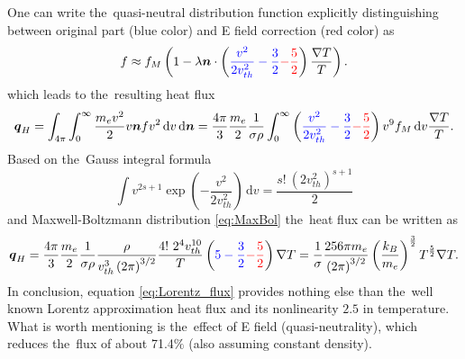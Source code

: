 \documentclass[review]{elsarticle}
\newcommand{\vect}[1]{\boldsymbol{#1}}
\newcommand{\dI}{\text{d}}
\newcommand{\mfp}{\lambda}
\newcommand{\vmag}{v}
\newcommand{\vth}{v_{th}}
\newcommand{\vn}{\vect{n}}
\newcommand{\me}{m_e}
\newcommand{\kB}{k_B}
\newcommand{\crs}{\sigma}
\newcommand{\fM}{f_M}
\begin{document}
One can write the~quasi-neutral distribution function explicitly 
distinguishing between original part (blue color) and E field correction
(red color) as
\begin{equation}
  f \approx \fM \left(1 - \mfp\vn\cdot\left( 
  \textcolor{blue}{
  \frac{\vmag^2}{2 \vth^2} - \frac{3}{2}
  }
  \textcolor{red}{
  - \frac{5}{2}
  }
  \right) \frac{\nabla T}{T} \right) .
  \label{eq:f_localized_quasineutral}
\end{equation}
which leads to the~resulting heat flux
\begin{equation}
  \vect{q}_H = \int_{4\pi}\int_0^{\infty} \frac{\me \vmag^2}{2} \vmag \vn f 
  \vmag^2\, \dI\vmag\, \dI\vn = \frac{4\pi}{3}\frac{\me}{2}\frac{1}{\crs\rho}
  \int_0^{\infty} \left( 
  \textcolor{blue}{
  \frac{\vmag^2}{2 \vth^2} - \frac{3}{2}
  }
  \textcolor{red}{
  - \frac{5}{2}
  }
  \right) \vmag^9 \fM\, \dI\vmag \frac{\nabla T}{T} .
  \nonumber
\end{equation} 
Based on the~Gauss integral formula
\begin{equation}
  \int \vmag^{2s+1} \exp\left(-\frac{\vmag^2}{2\vth^2}\right)\, \dI\vmag = 
  \frac{s!~(2 \vth^2)^{s+1}}{2}
  \nonumber 
\end{equation}
and Maxwell-Boltzmann distribution \eqref{eq:MaxBol} the~heat flux can be 
written as
\begin{equation}
  \vect{q}_H = \frac{4\pi}{3}\frac{\me}{2}\frac{1}{\crs\rho}
  \frac{\rho}{\vth^3 \left( 2 \pi \right)^{3/2}}
  \frac{4!~2^4 \vth^{10}}{T} \left( 
  \textcolor{blue}{
  5 - \frac{3}{2}
  }
  \textcolor{red}{
  - \frac{5}{2}
  }
  \right) \nabla T 
  = \frac{1}{\crs}\frac{256\pi \me}{\left( 2 \pi \right)^{3/2}}
  \left(\frac{\kB}{\me}\right)^{\frac{3}{2}}T^{\frac{5}{2}} \nabla T .
  \label{eq:Lorentz_flux}
\end{equation} 
In conclusion, equation \eqref{eq:Lorentz_flux} provides nothing else than
the~well known Lorentz approximation heat flux and its nonlinearity $2.5$
in temperature. What is worth mentioning is the~effect of E field 
(quasi-neutrality), which reduces the~flux of about	71.4$\%$ 
(also assuming constant density).
\end{document}
